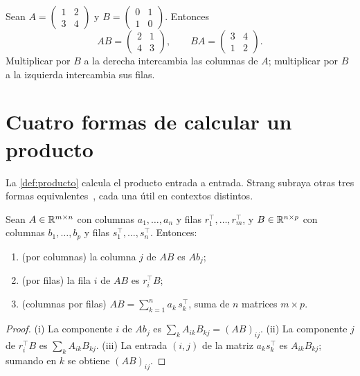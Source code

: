 \begin{ejemplo}\label{ej:intercambio}
Sean $A=\begin{pmatrix}1&2\\3&4\end{pmatrix}$ y $B=\begin{pmatrix}0&1\\1&0\end{pmatrix}$. Entonces
\[
AB=\begin{pmatrix}2&1\\4&3\end{pmatrix},\qquad BA=\begin{pmatrix}3&4\\1&2\end{pmatrix}.
\]
Multiplicar por $B$ a la derecha intercambia las columnas de $A$; multiplicar por $B$ a la izquierda intercambia sus filas.
\end{ejemplo}

\section{Cuatro formas de calcular un producto}

La \cref{def:producto} calcula el producto entrada a entrada. Strang subraya otras tres formas equivalentes~\cite[§2.4]{strang}, cada una útil en contextos distintos.

\begin{proposicion}\label{prop:cuatro}
Sean $A\in\mathbb{R}^{m\times n}$ con columnas $a_1,\dots,a_n$ y filas $r_1^{\top},\dots,r_m^{\top}$, y $B\in\mathbb{R}^{n\times p}$ con columnas $b_1,\dots,b_p$ y filas $s_1^{\top},\dots,s_n^{\top}$. Entonces:
\begin{enumerate}
  \item (por columnas) la columna $j$ de $AB$ es $Ab_j$;
  \item (por filas) la fila $i$ de $AB$ es $r_i^{\top}B$;
  \item (columnas por filas) $AB=\sum_{k=1}^{n}a_k\,s_k^{\top}$, suma de $n$ matrices $m\times p$.
\end{enumerate}
\end{proposicion}

\begin{proof}
(i) La componente $i$ de $Ab_j$ es $\sum_kA_{ik}B_{kj}=(AB)_{ij}$. (ii) La componente $j$ de $r_i^{\top}B$ es $\sum_kA_{ik}B_{kj}$. (iii) La entrada $(i,j)$ de la matriz $a_ks_k^{\top}$ es $A_{ik}B_{kj}$; sumando en $k$ se obtiene $(AB)_{ij}$.
\end{proof}

